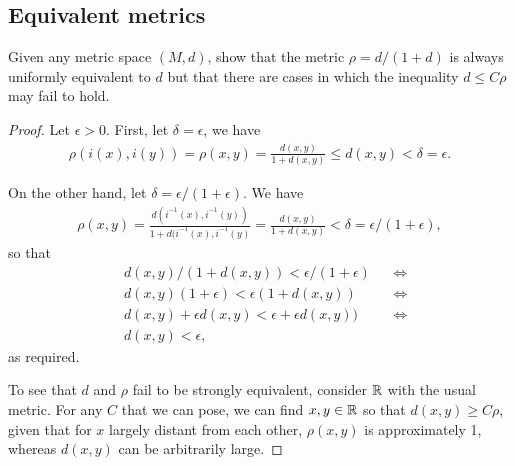 \subsection{Equivalent metrics}


\begin{exercise}{73}
Given any metric space $(M,d)$, show that the metric $\rho = d/(1+d)$ is always uniformly equivalent to $d$ but that there are cases in which the inequality $d\leq C\rho$ may fail to hold.
\end{exercise}
\begin{proof}
Let $\epsilon > 0$.
First, let $\delta=\epsilon$, we have 
\begin{align*}
    \rho(i(x),i(y)) 
    = \rho(x,y)
    = \frac{d(x,y)}{1+d(x,y)}
    \leq d(x,y) 
    < \delta
    = \epsilon.
\end{align*}

On the other hand, let $\delta = \epsilon/(1+\epsilon)$.
We have
\begin{align*}
    \rho(x,y)
    = \frac{d(i^{-1}(x),i^{-1}(y))}{1 + d(i^{-1}(x),i^{-1}(y)}
    = \frac{d(x,y)}{1 + d(x,y)}
    < \delta
    = \epsilon/(1+\epsilon),
\end{align*}
so that 
\begin{align*}
    &d(x,y)/(1+d(x,y)) < \epsilon/(1+\epsilon) &&\iff\\
    &d(x,y)(1+\epsilon) < \epsilon(1+d(x,y))  &&\iff\\
    &d(x,y) + \epsilon d(x,y) < \epsilon + \epsilon d(x,y))  &&\iff\\
    & d(x,y) < \epsilon,
\end{align*}
as required.

To see that $d$ and $\rho$ fail to be strongly equivalent, consider $\mathbb{R}$ with the usual metric.
For any $C$ that we can pose, we can find $x,y\in\mathbb{R}$ so that $d(x,y)\geq C\rho$, given that for $x$ largely distant from each other, $\rho(x,y)$ is approximately 1, whereas $d(x,y)$ can be arbitrarily large.
\end{proof} 


